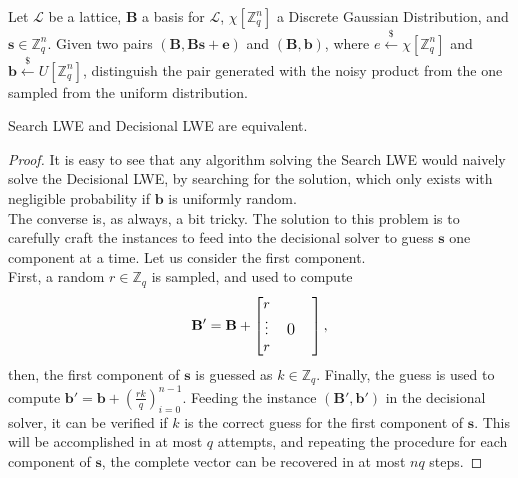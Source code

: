 \begin{definition}
Let $\mathscr{L}$ be a lattice, $\mathbf{B}$ a basis for $\mathscr{L}$, $\chi[\mathbb{Z}_q^n]$ a Discrete Gaussian Distribution, and $\mathbf{s}\in\mathbb{Z}_q^n$. Given two pairs $(\mathbf{B}, \mathbf{Bs}+\mathbf{e})$ and $(\mathbf{B},\mathbf{b})$, where $e\xleftarrow{\$}\chi[\mathbb{Z}_q^n]$ and $\mathbf{b}\xleftarrow{\$}U[\mathbb{Z}_q^n]$, distinguish the pair generated with the noisy product from the one sampled from the uniform distribution.
\end{definition}

\begin{theorem}
Search LWE and Decisional LWE are equivalent.
\end{theorem}
\begin{proof}
It is easy to see that any algorithm solving the Search LWE would naively solve the Decisional LWE, by searching for the solution, which only exists with negligible probability if $\mathbf{b}$ is uniformly random.\\
The converse is, as always, a bit tricky. The solution to this problem is to carefully craft the instances to feed into the decisional solver to guess $\mathbf{s}$ one component at a time.
Let us consider the first component.\\
First, a random $r\in\mathbb{Z}_q$ is sampled, and used to compute
\begin{equation*}
\mathbf{B}'=\mathbf{B}+
\begin{bmatrix}
r &&&\\
\vdots &  \multicolumn{2}{c}{\text{\large0}}\\
r &&& \\
\end{bmatrix},
\end{equation*}
then, the first component of $\mathbf{s}$ is guessed as $k\in\mathbb{Z}_q$. Finally, the guess is used to compute $\mathbf{b}'=\mathbf{b}+\left(\frac{rk}{q}\right)_{i=0}^{n-1}$. Feeding the instance $(\mathbf{B}',\mathbf{b}')$ in the decisional solver, it can be verified if $k$ is the correct guess for the first component of $\mathbf{s}$. This will be accomplished in at most $q$ attempts, and repeating the procedure for each component of $\mathbf{s}$, the complete vector can be recovered in at most $nq$ steps.
\end{proof}

